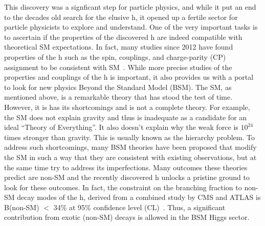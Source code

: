 This discovery was a signficant step for particle physics, and while it put an end to the decades old search for the elusive h, it opened up a fertile sector for particle physicists to explore and understand. One of the very important tasks is to ascertain if the properties of the discovered h are indeed compatible with theoretical SM expectations. In fact, many studies since 2012 have found properties of the h such as the spin, couplings, and charge-parity (CP) assignment to be consistent with SM~\cite{JHEP2016:45}. While more precise studies of the properties and couplings of the h is important, it also provides us with a portal to look for new physics Beyond the Standard Model (BSM). The SM, as mentioned above, is a remarkable theory that has stood the test of time. However, it is has its shortcomings and is not a complete theory. For example, the SM does not explain gravity and thus is inadequate as a candidate for an ideal ``Theory of Everything''. It also doesn't explain why the weak force is $10^24$ times stronger than gravity. This is usually known as the hierarchy problem. To address such shortcomings, many BSM theories have been proposed that modify the SM in such a way that they are consistent with existing observations, but at the same time try to address its imperfections. Many outcomes these theories predict are non-SM and the recently discovered h unlocks a pristine ground to look for these outcomes. In fact, the constraint on the branching fraction to non-SM decay modes of the h, derived from a combined study by CMS and ATLAS is B(non-SM) $<$ 34\% at 95\% confidence level (CL)~\cite{JHEP2016:45}. Thus, a significant contribution from exotic (non-SM) decays is allowed in the BSM Higgs sector.

